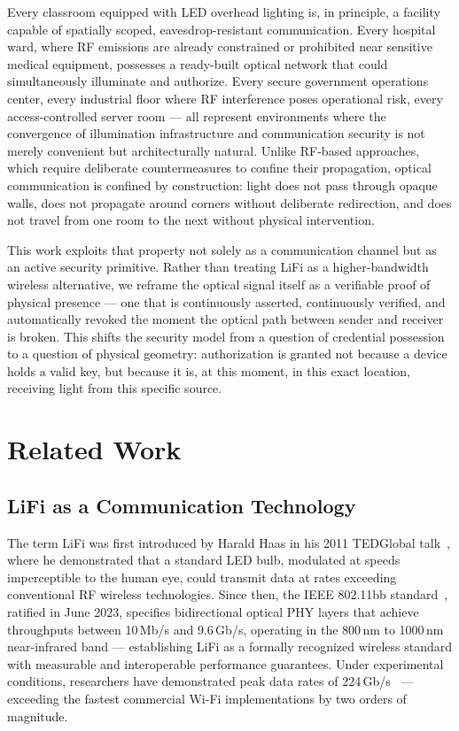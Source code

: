\documentclass[conference]{IEEEtran}
\begin{document}
Every classroom equipped with LED overhead lighting is, in principle, a facility capable of spatially scoped, eavesdrop-resistant communication. Every hospital ward, where RF emissions are already constrained or prohibited near sensitive medical equipment, possesses a ready-built optical network that could simultaneously illuminate and authorize. Every secure government operations center, every industrial floor where RF interference poses operational risk, every access-controlled server room — all represent environments where the convergence of illumination infrastructure and communication security is not merely convenient but architecturally natural. Unlike RF-based approaches, which require deliberate countermeasures to confine their propagation, optical communication is confined by construction: light does not pass through opaque walls, does not propagate around corners without deliberate redirection, and does not travel from one room to the next without physical intervention.

This work exploits that property not solely as a communication channel but as an active security primitive. Rather than treating LiFi as a higher-bandwidth wireless alternative, we reframe the optical signal itself as a verifiable proof of physical presence — one that is continuously asserted, continuously verified, and automatically revoked the moment the optical path between sender and receiver is broken. This shifts the security model from a question of credential possession to a question of physical geometry: authorization is granted not because a device holds a valid key, but because it is, at this moment, in this exact location, receiving light from this specific source.

\section{Related Work}

\subsection{LiFi as a Communication Technology}
The term LiFi was first introduced by Harald Haas in his 2011 TEDGlobal talk~\cite{haas2011}, where he demonstrated that a standard LED bulb, modulated at speeds imperceptible to the human eye, could transmit data at rates exceeding conventional RF wireless technologies. Since then, the IEEE 802.11bb standard~\cite{ieee80211bb}, ratified in June 2023, specifies bidirectional optical PHY layers that achieve throughputs between 10\,Mb/s and 9.6\,Gb/s, operating in the 800\,nm to 1000\,nm near-infrared band — establishing LiFi as a formally recognized wireless standard with measurable and interoperable performance guarantees. Under experimental conditions, researchers have demonstrated peak data rates of 224\,Gb/s~\cite{gomez2015} — exceeding the fastest commercial Wi-Fi implementations by two orders of magnitude.
\end{document}
